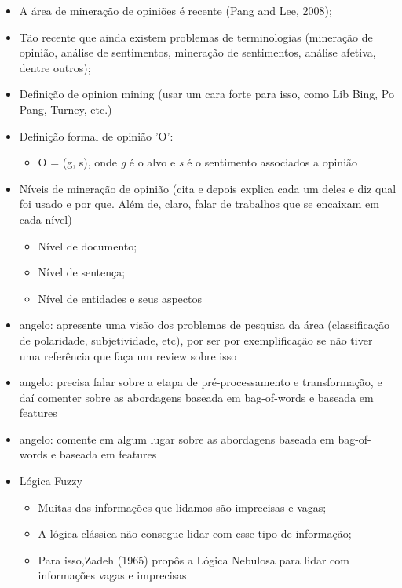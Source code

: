 \documentclass[msc, a4paper, classic, pt]{ufbathesis}
\begin{document}

\begin{itemize}
\item A área de mineração de opiniões é recente (Pang and Lee, 2008);
\item Tão recente que ainda existem problemas de terminologias (mineração de opinião, análise de sentimentos, mineração de sentimentos, análise afetiva, dentre outros);
\item Definição de opinion mining (usar um cara forte para isso, como Lib Bing, Po Pang, Turney, etc.)

\item Definição formal de opinião 'O':
\begin{itemize}
\item O = (g, s), onde \emph{g} é o alvo e \emph{s} é o sentimento associados a opinião
\end{itemize}

\item Níveis de mineração de opinião (cita e depois explica cada um deles e diz qual foi usado e por que. Além de, claro, falar de trabalhos que se encaixam em cada nível)
\begin{itemize}
\item Nível de documento;
\item Nível de sentença;
\item Nível de entidades e seus aspectos
\end{itemize}

\item angelo: apresente uma visão dos problemas de pesquisa da área (classificação de polaridade, subjetividade, etc), por ser por exemplificação se não tiver uma referência que faça um review sobre isso

\item angelo: precisa falar sobre a etapa de pré-processamento e transformação, e daí comenter sobre as abordagens baseada em bag-of-words e baseada em features 

\item angelo: comente em algum lugar sobre as abordagens baseada em bag-of-words e baseada em features 

\item Lógica Fuzzy
\begin{itemize}
\item Muitas das informações que lidamos são imprecisas e vagas;
\item A lógica clássica não consegue lidar com esse tipo de informação;
\item Para isso,Zadeh (1965) propôs a Lógica Nebulosa para lidar com informações vagas e imprecisas


\end{itemize}
\end{itemize}
\end{document}
